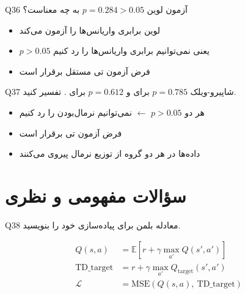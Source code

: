 \documentclass[oneside,openany,a4paper,12pt]{article}
\newcommand{\rsdrl}{\lr{RS-DRL}}
\newcommand{\dqn}{\lr{DQN}}
\begin{document}
\begin{questionbox}{Q36}
آزمون لوین $p=0.284 > 0.05$ به چه معناست؟
\end{questionbox}

\begin{hintbox}
\begin{itemize}
  \item لوین برابری واریانس‌ها را آزمون می‌کند
  \item $p>0.05$ یعنی نمی‌توانیم برابری واریانس‌ها را رد کنیم
  \item فرض آزمون تی مستقل برقرار است
\end{itemize}
\end{hintbox}

\begin{questionbox}{Q37}
شاپیرو-ویلک $p=0.785$ برای \rsdrl{} و $p=0.612$ برای \dqn{}. تفسیر کنید.
\end{questionbox}

\begin{hintbox}
\begin{itemize}
  \item هر دو $p > 0.05$ $\leftarrow$ نمی‌توانیم نرمال‌بودن را رد کنیم
  \item فرض آزمون تی برقرار است
  \item داده‌ها در هر دو گروه از توزیع نرمال پیروی می‌کنند
\end{itemize}
\end{hintbox}

\section{سؤالات مفهومی و نظری}

\begin{questionbox}{Q38}
معادله بلمن برای پیاده‌سازی \dqn{} خود را بنویسید.
\end{questionbox}

\begin{hintbox}
\begin{align}
Q(s,a) &= \mathbb{E}\left[r + \gamma \max_{a'} Q(s', a')\right] \\
\text{TD\_target} &= r + \gamma \max_{a'} Q_{\text{target}}(s', a') \\
\mathcal{L} &= \text{MSE}\!\left(Q(s,a),\ \text{TD\_target}\right)
\end{align}
\end{hintbox}
\end{document}
